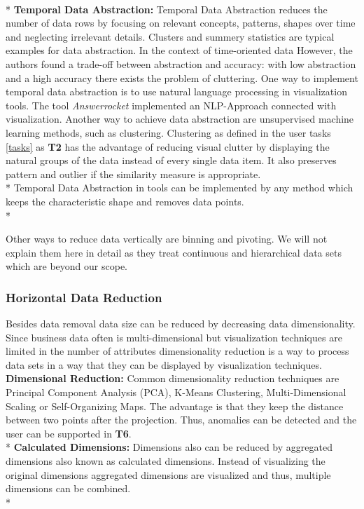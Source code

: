\\*
\textbf{Temporal Data Abstraction: }
Temporal Data Abstraction\cite{Aigner2011} reduces the number of data rows by focusing on relevant concepts, patterns, shapes over time and neglecting irrelevant details. Clusters and summery statistics\cite{PiringerHarald2011} are typical examples for data abstraction. In the context of time-oriented data  However, the authors found a trade-off between abstraction and accuracy: with low abstraction and a high accuracy there exists the problem of cluttering. 
One way to implement temporal data abstraction is to use natural language processing in visualization tools. The tool \textit{Answerrocket} implemented an NLP-Approach connected with visualization. Another way to achieve data abstraction are unsupervised machine learning methods, such as clustering.
Clustering as defined in the user tasks \ref{tasks} as \textbf{T2} has the advantage of reducing visual clutter by displaying the natural groups of the data instead of every single data item. It also preserves pattern and outlier if the similarity measure is appropriate.\\*
Temporal Data Abstraction in tools can be implemented by any method which keeps the characteristic shape and removes data points. \\*

Other ways to reduce data vertically are binning and pivoting. We will not explain them here in detail as they treat continuous and hierarchical data sets which are beyond our scope. 

\subsubsection{Horizontal Data Reduction}
Besides data removal data size can be reduced by decreasing data dimensionality. Since business data often is multi-dimensional but visualization techniques are limited in the number of attributes dimensionality reduction is a way to process data sets in a way that they can be displayed by visualization techniques. 
\textbf{Dimensional Reduction: }Common dimensionality reduction techniques are Principal Component Analysis (PCA)\cite{Aigner2008}, K-Means Clustering\cite{AllenHamilton}, Multi-Dimensional Scaling or  Self-Organizing Maps\cite{PiringerHarald2011}. The advantage is that they keep the distance between two points after the projection. Thus, anomalies can be detected and the user can be supported in \textbf{T6}.\\* 
\textbf{Calculated Dimensions: }Dimensions also can be reduced by aggregated dimensions also known as calculated dimensions. Instead of visualizing the original dimensions aggregated dimensions are visualized and thus, multiple dimensions can be combined.\\*

